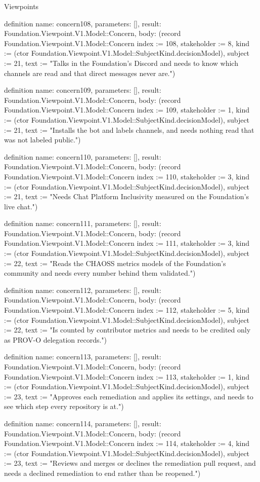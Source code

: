 \begin{lexlean}{Viewpoints}
\begin{semanticmodule}
definition{
  name: concern108,
  parameters: [],
  result: Foundation.Viewpoint.V1.Model::Concern,
  body: (record Foundation.Viewpoint.V1.Model::Concern {index := 108, stakeholder := 8, kind := (ctor Foundation.Viewpoint.V1.Model::SubjectKind.decisionModel), subject := 21, text := "Talks in the Foundation's Discord and needs to know which channels are read and that direct messages never are."})
}

definition{
  name: concern109,
  parameters: [],
  result: Foundation.Viewpoint.V1.Model::Concern,
  body: (record Foundation.Viewpoint.V1.Model::Concern {index := 109, stakeholder := 1, kind := (ctor Foundation.Viewpoint.V1.Model::SubjectKind.decisionModel), subject := 21, text := "Installs the bot and labels channels, and needs nothing read that was not labeled public."})
}

definition{
  name: concern110,
  parameters: [],
  result: Foundation.Viewpoint.V1.Model::Concern,
  body: (record Foundation.Viewpoint.V1.Model::Concern {index := 110, stakeholder := 3, kind := (ctor Foundation.Viewpoint.V1.Model::SubjectKind.decisionModel), subject := 21, text := "Needs Chat Platform Inclusivity measured on the Foundation's live chat."})
}

definition{
  name: concern111,
  parameters: [],
  result: Foundation.Viewpoint.V1.Model::Concern,
  body: (record Foundation.Viewpoint.V1.Model::Concern {index := 111, stakeholder := 3, kind := (ctor Foundation.Viewpoint.V1.Model::SubjectKind.decisionModel), subject := 22, text := "Reads the CHAOSS metrics models of the Foundation's community and needs every number behind them validated."})
}

definition{
  name: concern112,
  parameters: [],
  result: Foundation.Viewpoint.V1.Model::Concern,
  body: (record Foundation.Viewpoint.V1.Model::Concern {index := 112, stakeholder := 5, kind := (ctor Foundation.Viewpoint.V1.Model::SubjectKind.decisionModel), subject := 22, text := "Is counted by contributor metrics and needs to be credited only as PROV-O delegation records."})
}

definition{
  name: concern113,
  parameters: [],
  result: Foundation.Viewpoint.V1.Model::Concern,
  body: (record Foundation.Viewpoint.V1.Model::Concern {index := 113, stakeholder := 1, kind := (ctor Foundation.Viewpoint.V1.Model::SubjectKind.decisionModel), subject := 23, text := "Approves each remediation and applies its settings, and needs to see which step every repository is at."})
}

definition{
  name: concern114,
  parameters: [],
  result: Foundation.Viewpoint.V1.Model::Concern,
  body: (record Foundation.Viewpoint.V1.Model::Concern {index := 114, stakeholder := 4, kind := (ctor Foundation.Viewpoint.V1.Model::SubjectKind.decisionModel), subject := 23, text := "Reviews and merges or declines the remediation pull request, and needs a declined remediation to end rather than be reopened."})
}


\end{semanticmodule}
\end{lexlean}
